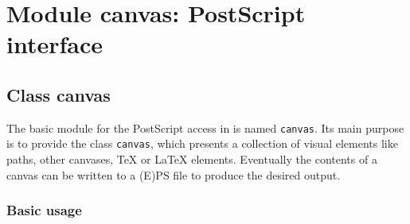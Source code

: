 \chapter{Module canvas: PostScript interface}

\label{canvas}

\section{Class canvas}

The basic module for the PostScript access in \PyX{} is named
\verb|canvas|. Its main purpose is to provide the class \verb|canvas|,
which presents a collection of visual elements like paths, other
canvases, \TeX{} or \LaTeX{} elements. Eventually the contents of a canvas 
can be written to a (E)PS file to produce the desired output.

\subsection{Basic usage}

